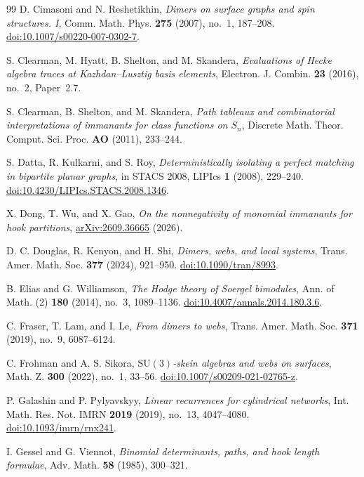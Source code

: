 \documentclass[11pt]{article}
\theoremstyle{definition}
\theoremstyle{remark}
\begin{document}
\begin{thebibliography}{99}
 D. Cimasoni and N. Reshetikhin, \emph{Dimers on surface graphs and spin structures. I}, Comm. Math. Phys. \textbf{275} (2007), no.~1, 187--208. \href{https://doi.org/10.1007/s00220-007-0302-7}{doi:10.1007/s00220-007-0302-7}.

 S. Clearman, M. Hyatt, B. Shelton, and M. Skandera, \emph{Evaluations of Hecke algebra traces at Kazhdan--Lusztig basis elements}, Electron. J. Combin. \textbf{23} (2016), no.~2, Paper~2.7.

 S. Clearman, B. Shelton, and M. Skandera, \emph{Path tableaux and combinatorial interpretations of immanants for class functions on $S_n$}, Discrete Math. Theor. Comput. Sci. Proc. \textbf{AO} (2011), 233--244.

 S. Datta, R. Kulkarni, and S. Roy, \emph{Deterministically isolating a perfect matching in bipartite planar graphs}, in STACS 2008, LIPIcs \textbf{1} (2008), 229--240. \href{https://doi.org/10.4230/LIPIcs.STACS.2008.1346}{doi:10.4230/LIPIcs.STACS.2008.1346}.

 X. Dong, T. Wu, and X. Gao, \emph{On the nonnegativity of monomial immanants for hook partitions}, \href{https://arxiv.org/abs/2609.36665}{arXiv:2609.36665} (2026).

 D. C. Douglas, R. Kenyon, and H. Shi, \emph{Dimers, webs, and local systems}, Trans. Amer. Math. Soc. \textbf{377} (2024), 921--950. \href{https://doi.org/10.1090/tran/8993}{doi:10.1090/tran/8993}.

 B. Elias and G. Williamson, \emph{The Hodge theory of Soergel bimodules}, Ann. of Math. (2) \textbf{180} (2014), no.~3, 1089--1136. \href{https://doi.org/10.4007/annals.2014.180.3.6}{doi:10.4007/annals.2014.180.3.6}.

 C. Fraser, T. Lam, and I. Le, \emph{From dimers to webs}, Trans. Amer. Math. Soc. \textbf{371} (2019), no.~9, 6087--6124.

 C. Frohman and A. S. Sikora, \emph{$\mathrm{SU}(3)$-skein algebras and webs on surfaces}, Math. Z. \textbf{300} (2022), no.~1, 33--56. \href{https://doi.org/10.1007/s00209-021-02765-z}{doi:10.1007/s00209-021-02765-z}.

 P. Galashin and P. Pylyavskyy, \emph{Linear recurrences for cylindrical networks}, Int. Math. Res. Not. IMRN \textbf{2019} (2019), no.~13, 4047--4080. \href{https://doi.org/10.1093/imrn/rnx241}{doi:10.1093/imrn/rnx241}.

 I. Gessel and G. Viennot, \emph{Binomial determinants, paths, and hook length formulae}, Adv. Math. \textbf{58} (1985), 300--321.


\end{thebibliography}
\end{document}
